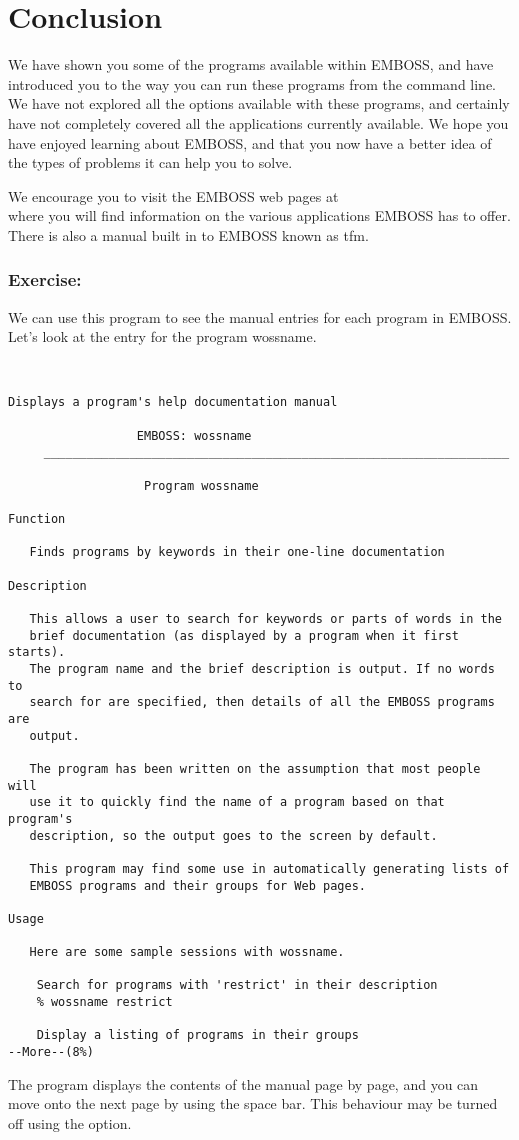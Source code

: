 \documentclass[12pt]{report}
\begin{document}
\chapter{Conclusion}
We have	shown you some of the programs available within	EMBOSS,	and
have introduced	you to the way you can run these programs from the
command	line. We have not explored all the options available with
these programs,	and certainly have not completely covered all the
applications currently available. We hope you have enjoyed learning
about EMBOSS, and that you now have a better idea of the types of
problems it can	help you to solve.

We encourage you to visit the EMBOSS web pages at \\
where you will find information	on the various applications EMBOSS has to offer. There is also a manual
built in to EMBOSS known as {\prog tfm}.

\subsection*{Exercise: }

We can use this	program	to see the manual entries for each program in EMBOSS. Let's look at the	entry
for the	program	wossname.

\unix{}\\

\begin{verbatim}
Displays a program's help documentation	manual

			      EMBOSS: wossname
     _________________________________________________________________

			       Program wossname

Function

   Finds programs by keywords in their one-line	documentation

Description

   This	allows a user to search	for keywords or	parts of words in the
   brief documentation (as displayed by	a program when it first	starts).
   The program name and	the brief description is output. If no words to
   search for are specified, then details of all the EMBOSS programs are
   output.

   The program has been	written	on the assumption that most people will
   use it to quickly find the name of a	program	based on that program's
   description,	so the output goes to the screen by default.

   This	program	may find some use in automatically generating lists of
   EMBOSS programs and their groups for	Web pages.

Usage

   Here	are some sample	sessions with wossname.

	Search for programs with 'restrict' in their description
	% wossname restrict

	Display	a listing of programs in their groups
--More--(8%)
\end{verbatim}

The program displays the contents of the manual	page by	page, and you can move onto the	next page
by using the space bar.	This behaviour may be turned off using the  option.



\end{document}
